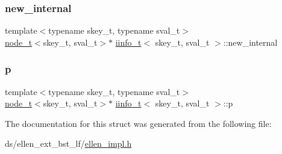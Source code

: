 \subsubsection{\texorpdfstring{new\+\_\+internal}{new\_internal}}
{\footnotesize\ttfamily template$<$typename skey\+\_\+t, typename sval\+\_\+t$>$ \\
\hyperlink{structnode__t}{node\+\_\+t}$<$skey\+\_\+t, sval\+\_\+t$>$$\ast$ \hyperlink{structiinfo__t}{iinfo\+\_\+t}$<$ skey\+\_\+t, sval\+\_\+t $>$\+::new\+\_\+internal}

\mbox{\label{structiinfo__t_ac481a80b2ca93f02845d28a7c2223a3f}} 
\subsubsection{\texorpdfstring{p}{p}}
{\footnotesize\ttfamily template$<$typename skey\+\_\+t, typename sval\+\_\+t$>$ \\
\hyperlink{structnode__t}{node\+\_\+t}$<$skey\+\_\+t, sval\+\_\+t$>$$\ast$ \hyperlink{structiinfo__t}{iinfo\+\_\+t}$<$ skey\+\_\+t, sval\+\_\+t $>$\+::p}



The documentation for this struct was generated from the following file\+:\begin{DoxyCompactItemize}
\item 
ds/ellen\+\_\+ext\+\_\+bst\+\_\+lf/\hyperlink{ellen__impl_8h}{ellen\+\_\+impl.\+h}\end{DoxyCompactItemize}

